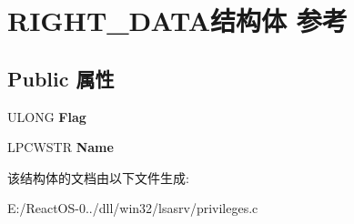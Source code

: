 \hypertarget{struct_r_i_g_h_t___d_a_t_a}{}\section{R\+I\+G\+H\+T\+\_\+\+D\+A\+T\+A结构体 参考}
\label{struct_r_i_g_h_t___d_a_t_a}
\subsection*{Public 属性}
\begin{DoxyCompactItemize}
\item 
\mbox{\label{struct_r_i_g_h_t___d_a_t_a_a8def0d1ef21016f386cb5d534b21781f}} 
U\+L\+O\+NG {\bfseries Flag}
\item 
\mbox{\label{struct_r_i_g_h_t___d_a_t_a_a9cb68f77c7d56907c9fd17e21cc7906b}} 
L\+P\+C\+W\+S\+TR {\bfseries Name}
\end{DoxyCompactItemize}


该结构体的文档由以下文件生成\+:\begin{DoxyCompactItemize}
\item 
E\+:/\+React\+O\+S-\/0../dll/win32/lsasrv/privileges.\+c\end{DoxyCompactItemize}
